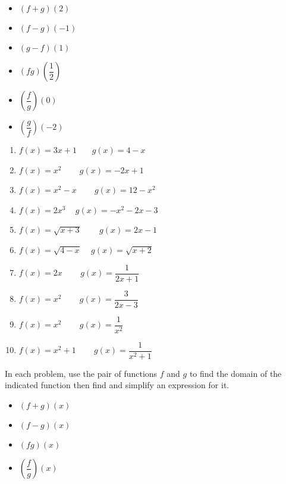 \documentclass[12pt]{article}
\theoremstyle{definition}
\begin{document}
\begin{multicols}{3}
\begin{itemize}

\item  $(f+g)(2)$ 
\item  $(f-g)(-1)$
\item  $(g-f)(1)$

\end{itemize}
\end{multicols}

\begin{multicols}{3}
\begin{itemize}

\item  $(fg)\left(\dfrac{1}{2}\right)$
\item  $\left(\dfrac{f}{g}\right)(0)$
\item  $\left(\dfrac{g}{f}\right)\left(-2\right)$

\end{itemize}
\end{multicols}

\begin{multicols}{2}
\begin{enumerate}
\item  $f(x) = 3x+1$~~~  $g(x) = 4-x$
\item  $f(x) = x^2$ ~~~ $g(x) = -2x+1$
\item  $f(x) = x^2 - x$ ~~~  $g(x) = 12-x^2$
\item  $f(x) = 2x^3$ ~ \mbox{$g(x) = -x^2-2x-3$}
\item  $f(x) = \sqrt{x+3}$ ~~~  $g(x) = 2x-1$
\item  $f(x) = \sqrt{4-x}$ ~ $g(x) = \sqrt{x+2}$
\item  $f(x) = 2x$ ~~~  $g(x) = \dfrac{1}{2x+1}$
\item  $f(x) = x^2$ ~~~ $g(x) = \dfrac{3}{2x-3}$
\item  $f(x) = x^2$ ~~~  $g(x) = \dfrac{1}{x^2}$
\item  $f(x) = x^2+1$ ~~~ $g(x) = \dfrac{1}{x^2+1}$
\end{enumerate}
\end{multicols}

In each problem, use the pair of functions $f$ and $g$ to find the domain of the indicated function then find and simplify an expression for it.

\begin{multicols}{4}
\begin{itemize}

\item  $(f+g)(x)$
\item  $(f-g)(x)$
\item  $(fg)(x)$
\item  $\left(\dfrac{f}{g}\right)(x)$

\end{itemize}
\end{multicols}
\end{document}
